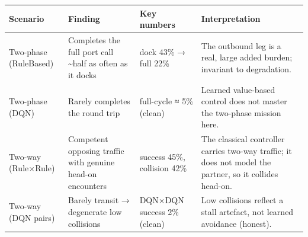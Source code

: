 \begin{tabular}{llll}
\toprule
Scenario & Finding & Key numbers & Interpretation \\
\midrule
Two-phase (RuleBased) & Completes the full port call \textasciitilde half as often as it docks & dock 43\% → full 22\% & The outbound leg is a real, large added burden; invariant to degradation. \\
Two-phase (DQN) & Rarely completes the round trip & full-cycle ≈ 5\% (clean) & Learned value-based control does not master the two-phase mission here. \\
Two-way (Rule×Rule) & Competent opposing traffic with genuine head-on encounters & success 45\%, collision 42\% & The classical controller carries two-way traffic; it does not model the partner, so it collides head-on. \\
Two-way (DQN pairs) & Barely transit → degenerate low collisions & DQN×DQN success 2\% (clean) & Low collisions reflect a stall artefact, not learned avoidance (honest). \\
\bottomrule
\end{tabular}

